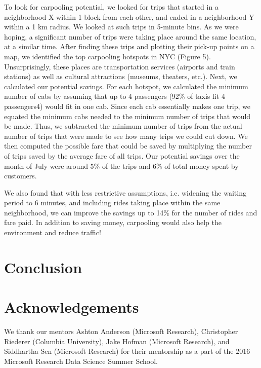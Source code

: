 \documentclass[]{article}
\begin{document}
\begin{multicols}{2}
To look for carpooling potential, we looked for trips that started in a neighborhood X within 1 block from each other, and ended in a neighborhood Y within a 1 km radius. We looked at such trips in 5-minute bins. As we were hoping, a significant number of trips were taking place around the same location, at a similar time. After finding these trips and plotting their pick-up points on a map, we identified the top carpooling hotspots in NYC (Figure 5). Unsurprisingly, these places are transportation services (airports and train stations) as well as cultural attractions (museums, theaters, etc.). 
Next, we calculated our potential savings. For each hotspot, we calculated the minimum number of cabs by assuming that up to 4 passengers (92\% of taxis fit 4 passengers4) would fit in one cab. Since each cab essentially makes one trip, we equated the minimum cabs needed to the minimum number of trips that would be made. Thus, we subtracted the minimum number of trips from the actual number of trips that were made to see how many trips we could cut down. We then computed the possible fare that could be saved by multiplying the number of trips saved by the average fare of all trips. Our potential savings over the month of July were around 5\% of the trips and 6\% of total money spent by customers.

We also found that with less restrictive assumptions, i.e. widening the waiting period to 6 minutes, and including rides taking place within the same neighborhood, we can improve the savings up to 14\% for the number of rides and fare paid. In addition to saving money, carpooling would also help the environment and reduce traffic! 
\section{Conclusion}

\section{Acknowledgements}
We thank our mentors Ashton Anderson (Microsoft Research), Christopher Riederer (Columbia University), Jake Hofman (Microsoft Research), and Siddhartha Sen (Microsoft Research) for their mentorship as a part of the 2016 Microsoft Research Data Science Summer School. 
\end{multicols}
\vspace{-0.5em}


\end{document}
